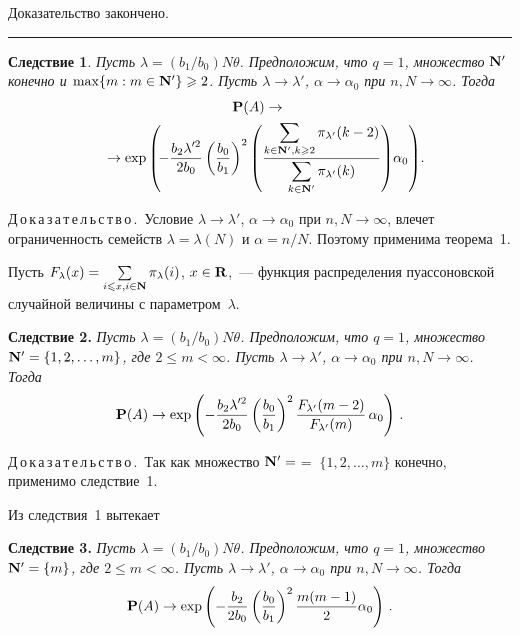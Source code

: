 \noindent
Доказательство закончено.
\smallskip

\hrule

\medskip


\begin{multicols}{2}



\noindent
{\bf Следствие 1}. {\it Пусть $\lambda=(b_1/b_0)N\theta$.
Предположим, что $q=1$, множество ${\bf N'}$ конечно и
 $\max\{m:m\in{\bf N'}\}\ge 2$.
 Пусть $\lambda\to\lambda'$,
$\alpha\to\alpha_0$ при $n, N\to\infty$. Тогда}
\begin{multline*}
{\bf P}(A)\to{}\\
\!{}\to  \exp
\left(\!-\fr{b_2\lambda'^2}{2b_0}\left(\fr{b_0}{b_1}\right)^2\left(\fr{\sum\limits_{k\in{\bf
N'},k\ge 2}\pi_{\lambda'}(k-2)}{\sum\limits_{k\in{\bf N'}}
\pi_{\lambda'}(k)}\right)\!\alpha_0\right)\!.\hspace*{-8pt}
\end{multline*}



\noindent
Д\,о\,к\,а\,з\,а\,т\,е\,л\,ь\,с\,т\,в\,о\,.\ Условие  $\lambda\to\lambda'$,
$\alpha\to\alpha_0$ при $n, N\to\infty$, влечет ограниченность
семейств $\lambda=\lambda(N)$ и $\alpha=n/N$. Поэтому
применима теорема~1.

Пусть $F_{\lambda}(x)=\sum\limits_{i\le x, i\in{\bf N}}\pi_{\lambda}(i)$,
$x\in{\bf R}$,~---  функция распределения пуассоновской случайной
величины с параметром~$\lambda$.

\smallskip


\noindent
{\bf Следствие 2.}  {\it Пусть $\lambda=(b_1/b_0)N\theta$.
Предположим, что $q=1$, множество ${\bf N'}=\{1, 2,\dots ,m\} $, где
$2\le m<\infty$.
 Пусть $\lambda\to\lambda'$,
$\alpha\to\alpha_0$ при $n, N\to\infty$. Тогда}
\begin{equation*}
{\bf P}(A)\to \exp
\left(-\fr{b_2\lambda'^2}{2b_0}\left(\fr{b_0}{b_1}\right)^2\fr{F_{\lambda'}(m-2)}{F_{\lambda'}(m)}\,\alpha_0\right)\,.
\end{equation*}

\medskip

\noindent
Д\,о\,к\,а\,з\,а\,т\,е\,л\,ь\,с\,т\,в\,о\,.\
Так как множество ${\bf N'}=$\linebreak $=\;\{1, 2,\dots  ,m\}$ конечно, применимо следствие~1.

\medskip

Из следствия~1 вытекает

\noindent
{\bf Следствие 3.}   {\it  Пусть $\lambda=(b_1/b_0)N\theta$.
Предположим, что $q=1$, множество   ${\bf N'}=\{m\}$, где  $2\le
m<\infty$.  Пусть $\lambda\to\lambda'$, $\alpha\to\alpha_0$ при
$n, N\to\infty$. Тогда}
\begin{equation*}
{\bf P}(A)\to \exp
\left(-\fr{b_2}{2b_0}\left(\fr{b_0}{b_1}\right)^2\fr{m(m-1)}{2}\alpha_0\right)\,.
\end{equation*}


\end{multicols}
